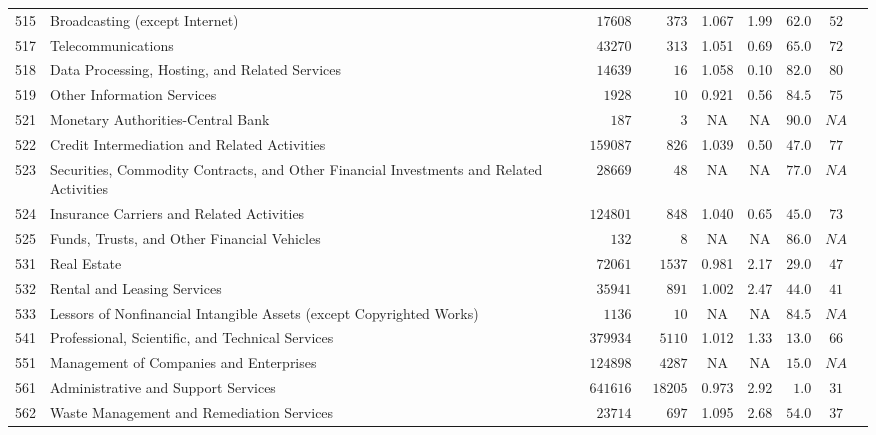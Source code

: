 \documentclass[9pt, oneside]{article}   	%
\begin{document}
\begin{longtable}{lp{3 in}ccccccc}
515  & Broadcasting (except Internet) & $\phantom{00}17608$ & $\phantom{000}373$ & 1.067 &  1.99 & $62.0$ & $52$ \\
517  & Telecommunications & $\phantom{00}43270$ & $\phantom{000}313$ & 1.051 &  0.69 & $65.0$ & $72$ \\
518  & Data Processing, Hosting, and Related Services & $\phantom{00}14639$ & $\phantom{0000}16$ & 1.058 &  0.10 & $82.0$ & $80$ \\
519  & Other Information Services & $\phantom{000}1928$ & $\phantom{0000}10$ & 0.921 &  0.56 & $84.5$ & $75$ \\
521  & Monetary Authorities-Central Bank & $\phantom{0000}187$ & $\phantom{00000}3$ &    NA &    NA & $90.0$ & $NA$ \\
522  & Credit Intermediation and Related Activities & $\phantom{0}159087$ & $\phantom{000}826$ & 1.039 &  0.50 & $47.0$ & $77$ \\
523  & Securities, Commodity Contracts, and Other Financial Investments and Related Activities & $\phantom{00}28669$ & $\phantom{0000}48$ &    NA &    NA & $77.0$ & $NA$ \\
524  & Insurance Carriers and Related Activities & $\phantom{0}124801$ & $\phantom{000}848$ & 1.040 &  0.65 & $45.0$ & $73$ \\
525  & Funds, Trusts, and Other Financial Vehicles & $\phantom{0000}132$ & $\phantom{00000}8$ &    NA &    NA & $86.0$ & $NA$ \\
531  & Real Estate & $\phantom{00}72061$ & $\phantom{00}1537$ & 0.981 &  2.17 & $29.0$ & $47$ \\
532  & Rental and Leasing Services & $\phantom{00}35941$ & $\phantom{000}891$ & 1.002 &  2.47 & $44.0$ & $41$ \\
533  & Lessors of Nonfinancial Intangible Assets (except Copyrighted Works) & $\phantom{000}1136$ & $\phantom{0000}10$ &    NA &    NA & $84.5$ & $NA$ \\
541  & Professional, Scientific, and Technical Services & $\phantom{0}379934$ & $\phantom{00}5110$ & 1.012 &  1.33 & $13.0$ & $66$ \\
551  & Management of Companies and Enterprises & $\phantom{0}124898$ & $\phantom{00}4287$ &    NA &    NA & $15.0$ & $NA$ \\
561  & Administrative and Support Services & $\phantom{0}641616$ & $\phantom{0}18205$ & 0.973 &  2.92 & $\phantom{0}1.0$ & $31$ \\
562  & Waste Management and Remediation Services & $\phantom{00}23714$ & $\phantom{000}697$ & 1.095 &  2.68 & $54.0$ & $37$ \\

\end{longtable}
\end{document}
